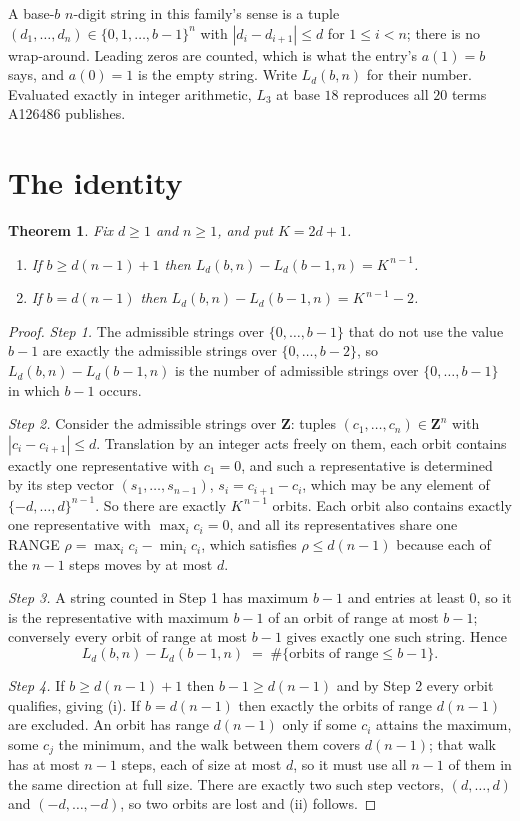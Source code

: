\documentclass[11pt,a4paper]{article}
\theoremstyle{plain}
\newtheorem{theorem}{Theorem}
\theoremstyle{definition}
\begin{document}
A base-$b$ $n$-digit string in this family's sense is a tuple
$(d_1,\dots,d_n)\in\{0,1,\dots,b-1\}^{n}$ with $|d_i-d_{i+1}|\le d$ for $1\le i<n$; there
is no wrap-around. Leading zeros are counted, which is what the entry's $a(1)=b$ says, and
$a(0)=1$ is the empty string. Write $L_d(b,n)$ for their number. Evaluated exactly in integer
arithmetic, $L_{3}$ at base $18$ reproduces all $20$ terms A126486 publishes.

\section{The identity}

\begin{theorem}
Fix $d\ge1$ and $n\ge1$, and put $K=2d+1$.
\begin{enumerate}
\item[(i)] If $b\ge d(n-1)+1$ then $L_d(b,n)-L_d(b-1,n)=K^{\,n-1}$.
\item[(ii)] If $b=d(n-1)$ then $L_d(b,n)-L_d(b-1,n)=K^{\,n-1}-2$.
\end{enumerate}
\end{theorem}

\begin{proof}
\emph{Step 1.} The admissible strings over $\{0,\dots,b-1\}$ that do not use the value $b-1$
are exactly the admissible strings over $\{0,\dots,b-2\}$, so $L_d(b,n)-L_d(b-1,n)$ is the
number of admissible strings over $\{0,\dots,b-1\}$ in which $b-1$ occurs.

\emph{Step 2.} Consider the admissible strings over $\mathbf{Z}$: tuples
$(c_1,\dots,c_n)\in\mathbf{Z}^{n}$ with $|c_i-c_{i+1}|\le d$. Translation by an integer acts
freely on them, each orbit contains exactly one representative with $c_1=0$, and such a
representative is determined by its step vector $(s_1,\dots,s_{n-1})$, $s_i=c_{i+1}-c_i$,
which may be any element of $\{-d,\dots,d\}^{n-1}$. So there are exactly $K^{\,n-1}$ orbits.
Each orbit also contains exactly one representative with $\max_i c_i=0$, and all its
representatives share one RANGE $\rho=\max_ic_i-\min_ic_i$, which satisfies
$\rho\le d(n-1)$ because each of the $n-1$ steps moves by at most $d$.

\emph{Step 3.} A string counted in Step 1 has maximum $b-1$ and entries at least $0$, so it is
the representative with maximum $b-1$ of an orbit of range at most $b-1$; conversely every orbit
of range at most $b-1$ gives exactly one such string. Hence
\[
L_d(b,n)-L_d(b-1,n)\;=\;\#\{\text{orbits of range}\le b-1\} .
\]

\emph{Step 4.} If $b\ge d(n-1)+1$ then $b-1\ge d(n-1)$ and by Step 2 every orbit qualifies,
giving (i). If $b=d(n-1)$ then exactly the orbits of range $d(n-1)$ are excluded. An orbit has
range $d(n-1)$ only if some $c_i$ attains the maximum, some $c_j$ the minimum, and the walk
between them covers $d(n-1)$; that walk has at most $n-1$ steps, each of size at most $d$, so it
must use all $n-1$ of them in the same direction at full size. There are exactly two such step
vectors, $(d,\dots,d)$ and $(-d,\dots,-d)$, so two orbits are lost and (ii) follows.
\end{proof}
\end{document}
